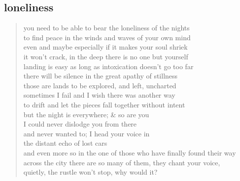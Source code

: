 \documentclass[11pt]{article}
\begin{document}
\subsection{loneliness}
\label{sec:orge752d32}
\begin{verse}
you need to be able to bear the loneliness of the nights\\
to find peace in the winds and waves of your own mind\\
even and maybe especially if it makes your soul shriek\\
it won't crack, in the deep there is no one but yourself\\
\vspace*{1em}
landing is easy as long as intoxication doesn't go too far\\
there will be silence in the great apathy of stillness\\
those are lands to be explored, and left, uncharted\\
sometimes I fail and I wish there was another way\\
to drift and let the pieces fall together without intent\\
\vspace*{1em}
but the night is everywhere; \& so are you\\
I could never dislodge you from there\\
and never wanted to; I head your voice in\\
the distant echo of lost cars\\
and even more so in the one of those who have finally found their way\\
across the city there are so many of them, they chant your voice,\\
quietly, the rustle won't stop, why would it?\\
\end{verse}
\end{document}
